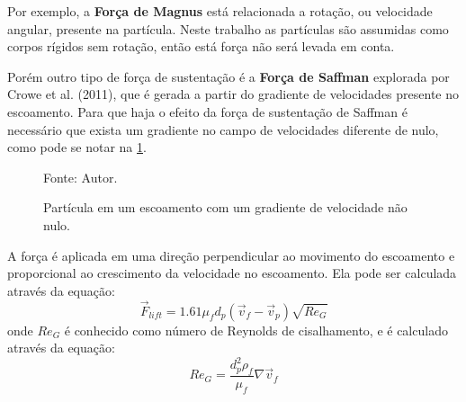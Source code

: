 \begin{itemize}
        Por exemplo, a \textbf{Força de Magnus} está relacionada a rotação, ou velocidade angular, presente na partícula.
        Neste trabalho as partículas são assumidas como corpos rígidos sem rotação, então está força não será levada em conta.

        Porém outro tipo de força de sustentação é a \textbf{Força de Saffman} explorada por Crowe et al. (2011)\cite{crowe}, que é gerada a partir do gradiente de velocidades presente no escoamento.
        Para que haja o efeito da força de sustentação de Saffman é necessário que exista um gradiente no campo de velocidades diferente de nulo, como pode se notar na \ref{saffman}.
        \begin{figure}[H]
            \centering
             {\raggedleft \scriptsize Fonte: Autor.}
            \caption{Partícula em um escoamento com um gradiente de velocidade não nulo.}
            \label{saffman}
        \end{figure}

        A força é aplicada em uma direção perpendicular ao movimento do escoamento e proporcional ao crescimento da velocidade no escoamento.
        Ela pode ser calculada através da equação:
        \begin{equation}
            \vec{F}_{lift} = 1.61 \mu_f d_p \left(\vec{v}_{f} - \vec{v}_{p} \right) \sqrt{{Re}_G}
            \label{lift}
        \end{equation}
        onde $Re_{G}$ é conhecido como número de Reynolds de cisalhamento, e é calculado através da equação:
        \begin{equation}
            Re_G = \dfrac{d_p^2 \rho_f}{\mu_f} \nabla \vec{v}_f
            \label{reg}
        \end{equation}


\end{itemize}
